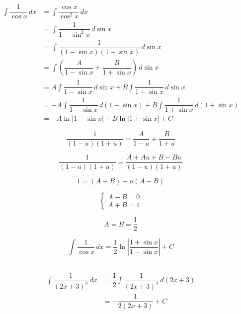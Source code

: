 \documentclass{scrartcl}
\begin{document}
\subsection{}

\begin{align*}
\displaystyle \int \dfrac{1}{\cos{x}}\,dx
&= \int \dfrac{\cos{x}}{\cos^2{x}} \,dx\\
&= \int \dfrac{1}{1-\sin^2{x}} \,d\sin{x}\\
&= \int \dfrac{1}{(1-\sin{x})(1+\sin{x})} \,d\sin{x}\\
&= \int \left(\dfrac{A}{1-\sin{x}} + \dfrac{B}{1+\sin{x}} \right) \,d\sin{x}\\
&= A \int \dfrac{1}{1-\sin{x}}\, d\sin{x} + B \int \dfrac{1}{1+\sin{x}} \, d\sin{x}\\
&= -A \int \dfrac{1}{1-\sin{x}}\, d(1-\sin{x}) + B \int \dfrac{1}{1+\sin{x}} \, d(1+\sin{x})\\
&= -A \ln|1-\sin{x}| + B \ln|1+\sin{x}| + C
\end{align*}

\begin{FlushLeft}
\end{FlushLeft}

$$\dfrac{1}{(1-u)(1+u)} = \dfrac{A}{1-u} + \dfrac{B}{1+u}$$

$$\dfrac{1}{(1-u)(1+u)} = \dfrac{A + Au + B - Bu}{(1-u)(1+u)}$$

$$1 = (A+B) + u(A-B)$$

$$
\begin{cases}
A-B=0 \\
A+B=1
\end{cases}
$$

$$A = B = \dfrac{1}{2}$$

$$\displaystyle \int \dfrac{1}{\cos{x}}\,dx = \dfrac{1}{2}\ln\left|\dfrac{1+\sin{x}}{1-\sin{x}}\right|+C$$

\subsection{}

\begin{align*}
\displaystyle \int \dfrac{1}{(2x+3)^2}\,dx
&= \dfrac{1}{2}\int \dfrac{1}{(2x+3)^2} \,d(2x+3)\\
&= -\dfrac{1}{2(2x+3)} + C
\end{align*}

\subsection{}
\end{document}
